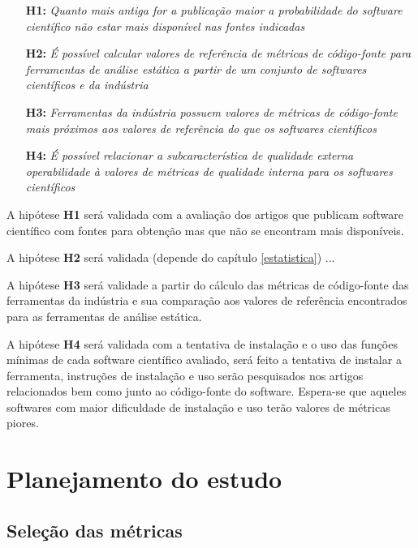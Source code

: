 \documentclass[qual, classic, a4paper]{ufbathesis}
\begin{document}
\begin{enumerate}
  \item[{\bf H1:}] {\em Quanto mais antiga for a publicação maior a
    probabilidade do software científico não estar mais disponível nas fontes
    indicadas}
  \item[{\bf H2:}] {\em É possível calcular valores de referência de métricas
    de código-fonte para ferramentas de análise estática a partir de um
    conjunto de softwares científicos e da indústria}
  \item[{\bf H3:}] {\em Ferramentas da indústria possuem valores de métricas
    de código-fonte mais próximos aos valores de referência do que os
    softwares científicos}
  \item[{\bf H4:}] {\em É possível relacionar a subcaracterística de qualidade
    externa operabilidade à valores de métricas de qualidade interna para os
    softwares científicos}
\end{enumerate}


A hipótese {\bf H1} será validada com a avaliação dos artigos que publicam
software científico com fontes para obtenção mas que não se encontram mais
disponíveis.

A hipótese {\bf H2} será validada (depende do capítulo \ref{estatistica}) ...

A hipótese {\bf H3} será validade a partir do cálculo das métricas de
código-fonte das ferramentas da indústria e sua comparação aos valores de
referência encontrados para as ferramentas de análise estática.

A hipótese {\bf H4} será validada com a tentativa de instalação e o uso das
funções mínimas de cada software científico avaliado, será feito a tentativa
de instalar a ferramenta, instruções de instalação e uso serão pesquisados nos
artigos relacionados bem como junto ao código-fonte do software. Espera-se que
aqueles softwares com maior dificuldade de instalação e uso terão valores de
métricas piores.

\section{Planejamento do estudo}

\subsection{Seleção das métricas}
\end{document}
